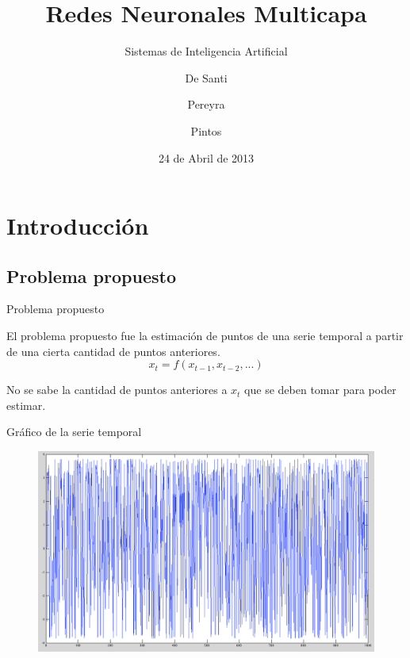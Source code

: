 \documentclass{beamer}
\title{Redes Neuronales Multicapa}
\author{De Santi \and Pereyra \and Pintos }
\subtitle{Sistemas de Inteligencia Artificial}
\date{24 de Abril de 2013}
\begin{document}
\frame{\titlepage}

\section[Outline]{}
\frame{\tableofcontents}

\section{Introducción}
\subsection{Problema propuesto}
\begin{frame}{Problema propuesto}

\par El problema propuesto fue la estimación de puntos de una serie temporal a partir de una cierta cantidad de puntos anteriores.
\[
  x_{t} = f(x_{t-1}, x_{t-2},...) 
\]

\vspace{10px}
\par No se sabe la cantidad de puntos anteriores a \begin{math} x_{t} \end{math} que se deben tomar para poder estimar.

\end{frame}

\begin{frame}{Gráfico de la serie temporal}

\begin{figure}[H]
\begin{center}
\includegraphics[scale=0.25]{images/serie.png}
\label{modelado}
\end{center}
\end{figure}

\end{frame}
\end{document}
